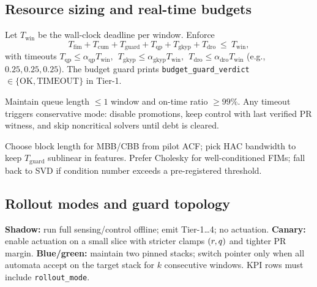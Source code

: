 \subsection{Resource sizing and real-time budgets}\label{subsec:res-sizing}
\emph{}

\begin{definition}\label{def:budget}
Let $T_{\mathrm{win}}$ be the wall-clock deadline per window. Enforce
\[
T_{\mathrm{fim}}+T_{\mathrm{cum}}+T_{\mathrm{guard}}+T_{\mathrm{qp}}+T_{\mathrm{gkyp}}+T_{\mathrm{dro}}\ \le\ T_{\mathrm{win}},
\]
with timeouts \(T_{\mathrm{qp}}\le \alpha_{\mathrm{qp}}T_{\mathrm{win}},\ \ T_{\mathrm{gkyp}}\le \alpha_{\mathrm{gkyp}}T_{\mathrm{win}},\ \ T_{\mathrm{dro}}\le \alpha_{\mathrm{dro}}T_{\mathrm{win}}\) (e.g., $0.25,0.25,0.25$). The budget guard prints \texttt{budget\_guard\_verdict} $\in\{\text{OK},\text{TIMEOUT}\}$ in Tier-1.
\end{definition}

\begin{proposition}\label{prop:slo}
Maintain queue length $\le 1$ window and on-time ratio $\ge 99\%$. Any timeout triggers conservative mode: disable promotions, keep control with last verified PR witness, and skip noncritical solvers until debt is cleared.
\end{proposition}

\begin{remark}\label{rem:sizing}
Choose block length for MBB/CBB from pilot ACF; pick HAC bandwidth to keep $T_{\mathrm{guard}}$ sublinear in features. Prefer Cholesky for well-conditioned FIMs; fall back to SVD if condition number exceeds a pre-registered threshold.
\end{remark}

\subsection{Rollout modes and guard topology}\label{subsec:rollout-modes}
\emph{}

\begin{definition}\label{def:rollout-modes}
\textbf{Shadow:} run full sensing/control offline; emit Tier-1…4; no actuation. \textbf{Canary:} enable actuation on a small slice with stricter clamps $(r,q)$ and tighter PR margin. \textbf{Blue/green:} maintain two pinned stacks; switch pointer only when all automata accept on the target stack for $k$ consecutive windows. KPI rows must include \texttt{rollout\_mode}.
\end{definition}

